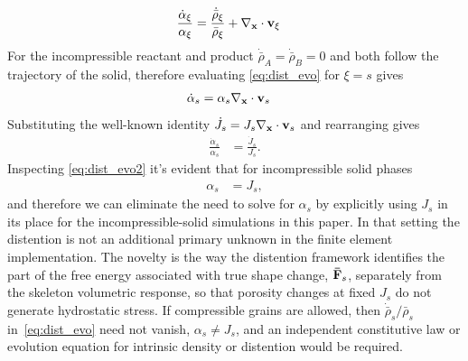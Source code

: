 \documentclass[11pt]{article}
\begin{document}
%
\begin{align}
  \frac{\dot{\alpha}_\xi}{\alpha_\xi}  &= \frac{\dot{\bar\rho}_\xi}{\bar\rho_\xi} + \nabla_{\mathbf{x}} \cdot \mathbf{v}_\xi \label{eq:dist_evo}
\end{align}
%
For the incompressible reactant and product $\dot{\bar\rho}_A = \dot{\bar\rho}_B = 0$ and both follow the trajectory of the solid, therefore evaluating \eqref{eq:dist_evo} for $\xi = s$ gives
%
\begin{align}
  \dot{\alpha}_s &= {\alpha_s} \nabla_{\mathbf{x}} \cdot \mathbf{v}_s \notag
\end{align}
%
Substituting the well-known identity $\dot{J}_s = J_s \nabla_{\mathbf{x}} \cdot \mathbf{v}_s$ and rearranging gives
%
\begin{align}
  \frac{\dot{\alpha}_s}{\alpha_s} &=  \frac{\dot{J}_s}{J_s}.  \label{eq:dist_evo2}
\end{align}
%
Inspecting \eqref{eq:dist_evo2} it's evident that for incompressible solid phases
%
\begin{align}
  \alpha_s &=  J_s,  \label{eq:dist_evo3}
\end{align}
%
and therefore we can eliminate the need to solve for $\alpha_s$ by explicitly using $J_s$ in its place for the incompressible-solid simulations in this paper.  In that setting the distention is not an additional primary unknown in the finite element implementation.  The novelty is the way the distention framework identifies the part of the free energy associated with true shape change, $\mathbf{\bar F}_s$, separately from the skeleton volumetric response, so that porosity changes at fixed $J_s$ do not generate hydrostatic stress.  If compressible grains are allowed, then $\dot{\bar\rho}_s/\bar\rho_s$ in~\eqref{eq:dist_evo} need not vanish, $\alpha_s\neq J_s$, and an independent constitutive law or evolution equation for intrinsic density or distention would be required.
\end{document}
